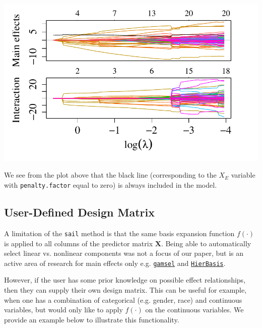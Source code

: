 			
			\begin{knitrout}\scriptsize
			\color{fgcolor}\begin{kframe}
			\begin{alltt}
			\end{alltt}
			\end{kframe}
			
			{\centering \includegraphics[width=1\linewidth]{figs/sail-pf-path-1} 
				
			}
			
			
			
			\end{knitrout}
			
			
			We see from the plot above that the black line (corresponding to the $X_E$ variable with \texttt{penalty.factor} equal to zero) is always included in the model.   
			
			\subsection{User-Defined Design Matrix} \label{ap:userdesign}
			
			A limitation of the  \texttt{sail} method is that the same basis expansion function $f(\cdot)$ is applied to all columns of the predictor matrix $\mathbf{X}$. Being able to automatically select linear vs. nonlinear components was not a focus of our paper, but is an active area of research for main effects only e.g. \href{https://cran.r-project.org/package=gamsel}{\texttt{gamsel}} and \href{https://github.com/asadharis/HierBasis}{\texttt{HierBasis}}.   
			
			However, if the user has some prior knowledge on possible effect relationships, then they can supply their own design matrix. This can be useful for example, when one has a combination of categorical (e.g. gender, race) and continuous variables, but would only like to apply $f(\cdot)$ on the continuous variables. We provide an example below to illustrate this functionality.  
			
